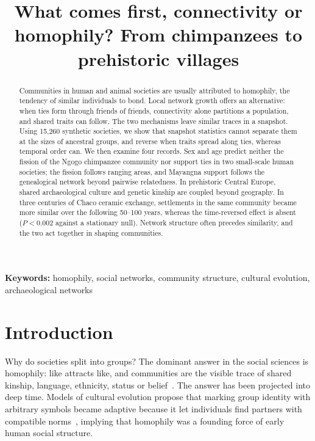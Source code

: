 \documentclass[11pt]{article}
\title{What comes first, connectivity or homophily? From chimpanzees to prehistoric villages}
\author{}
\date{}
\begin{document}
\maketitle

\begin{abstract}
\noindent
Communities in human and animal societies are usually attributed to homophily, the tendency of similar
individuals to bond. Local network growth offers an alternative: when ties form through friends of
friends, connectivity alone partitions a population, and shared traits can follow. The two mechanisms
leave similar traces in a snapshot. Using 15,260 synthetic societies, we show that snapshot statistics
cannot separate them at the sizes of ancestral groups, and reverse when traits spread along ties,
whereas temporal order can. We then examine four records. Sex and age predict neither the fission of the
Ngogo chimpanzee community nor support ties in two small-scale human societies; the fission follows
ranging areas, and Mayangna support follows the genealogical network beyond pairwise relatedness. In
prehistoric Central Europe, shared archaeological culture and genetic kinship are coupled beyond
geography. In three centuries of Chaco ceramic exchange, settlements in the same community became more
similar over the following 50--100 years, whereas the time-reversed effect is absent ($P<0.002$ against
a stationary null). Network structure often precedes similarity, and the two act together in shaping
communities.
\end{abstract}

\noindent\textbf{Keywords:} homophily, social networks, community structure, cultural evolution,
archaeological networks

\section{Introduction}

Why do societies split into groups? The dominant answer in the social sciences is homophily: like
attracts like, and communities are the visible trace of shared kinship, language, ethnicity, status or
belief~\cite{McPherson2001}. The answer has been projected into deep time. Models of cultural evolution
propose that marking group identity with arbitrary symbols became adaptive because it let individuals
find partners with compatible norms~\cite{McElreath2003}, implying that homophily was a founding force of
early human social structure.
\end{document}
